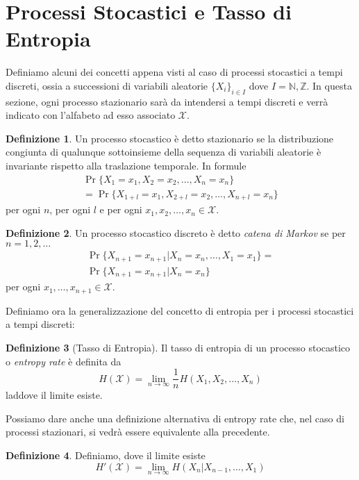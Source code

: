 \documentclass[a4paper,11pt]{book}
\theoremstyle{plain}
\theoremstyle{definition}
\newtheorem{defn}{Definizione}[chapter]
\theoremstyle{remark}
\newcommand{\Z}{\mathbb{Z}}
\newcommand{\N}{\mathbb{N}}
\begin{document}
\section{Processi Stocastici e Tasso di Entropia}
Definiamo alcuni dei concetti appena visti al caso di processi stocastici a tempi discreti, ossia a successioni di variabili aleatorie $\{X_i\}_{i\in I}$ dove $I = \N, \Z$. In questa sezione, ogni processo stazionario sarà da intendersi a tempi discreti e verrà indicato con l'alfabeto ad esso associato $\mathcal{X}$.
\begin{defn}
	Un processo stocastico è detto stazionario se la distribuzione congiunta di qualunque sottoinsieme della sequenza di variabili aleatorie è invariante rispetto alla traslazione temporale. In formule
	\begin{align*}
		\Pr\{X_1 = x_1, X_2 = x_2, \ldots, X_n = x_n\} \\
		= \Pr\{X_{1+l} =x_{1}, X_{2+l} = x_{2}, \ldots, X_{n+l} = x_{n}\}
	\end{align*}
	per ogni $n$, per ogni $l$ e per ogni $x_1,x_2,\ldots, x_n\in \mathcal{X}$.
\end{defn}
\begin{defn}
	Un processo stocastico discreto è detto \textit{catena di Markov} se per $n = 1, 2, \ldots$
	\begin{align*}
		\Pr\{X_{n+1}=x_{n+1}|X_n = x_n, \ldots,X_1= x_1\}=\\
		\Pr\{X_{n+1} = x_{n+1}|X_n = x_n\}
	\end{align*}
	per ogni $x_1,\ldots, x_{n+1}\in \mathcal{X}$.
\end{defn}
Definiamo ora la generalizzazione del concetto di entropia per i processi stocastici a tempi discreti:
\begin{defn}[Tasso di Entropia]
Il tasso di entropia di un processo stocastico o \textit{entropy rate} è definita da
	\begin{equation*}
		H(\mathcal{X}) = \lim\limits_{n\to \infty}\frac{1}{n}H(X_1,X_2,\ldots, X_n)
	\end{equation*}
	laddove il limite esiste.
\end{defn}
Possiamo dare anche una definizione alternativa di entropy rate che, nel caso di processi stazionari, si vedrà essere equivalente alla precedente.
\begin{defn}
	Definiamo, dove il limite esiste
	\begin{equation}
		H'(\mathcal{X}) = \lim\limits_{n\to \infty}H(X_n|X_{n-1},\ldots, X_1)
	\end{equation}
\end{defn}
\end{document}
